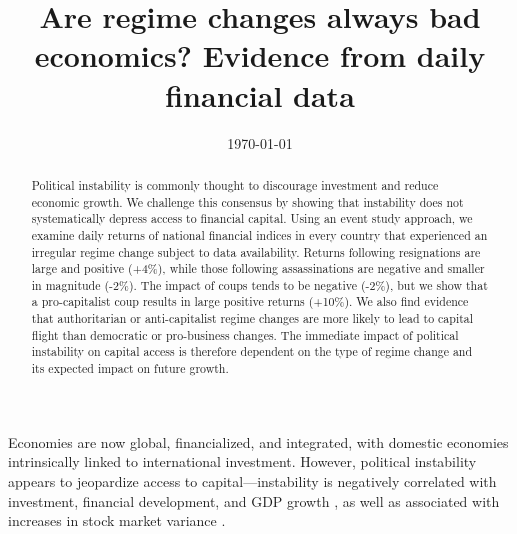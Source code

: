\documentclass[12pt,final,fleqn]{article}
\theoremstyle{plain}
\begin{document}
\title{\textbf{Are regime changes always bad economics? Evidence from daily financial data}}
\date{\today}
\maketitle
\thispagestyle{empty}

\singlespacing
\begin{abstract}
\noindent
Political instability is commonly thought to discourage investment and reduce economic growth. We challenge this consensus by showing that instability does not systematically depress access to financial capital. Using an event study approach, we examine daily returns of national financial indices in every country that experienced an irregular regime change subject to data availability. Returns following resignations are large and positive (+4\%), while those following assassinations are negative and smaller in magnitude (-2\%). The impact of coups tends to be negative (-2\%), but we show that a pro-capitalist coup results in large positive returns (+10\%). We also find evidence that authoritarian or anti-capitalist regime changes are more likely to lead to capital flight than democratic or pro-business changes.  The immediate impact of political instability on capital access is therefore dependent on the type of regime change and its expected impact on future growth. 

\end{abstract}

\clearpage
{}

\newpage

Economies are now global, financialized, and integrated, with domestic economies intrinsically linked to international investment. However, political instability appears to jeopardize access to capital---instability is negatively correlated with investment, financial development, and GDP growth \citep{aisen2013does, alesina1996income, alesina1996political, fosu1992political, jong2009measurement, roe2011political, baker2016measuring}, as well as associated with increases in stock market variance \citep{leblang2005government, jensen2005market, liu2015economic}.
\end{document}
